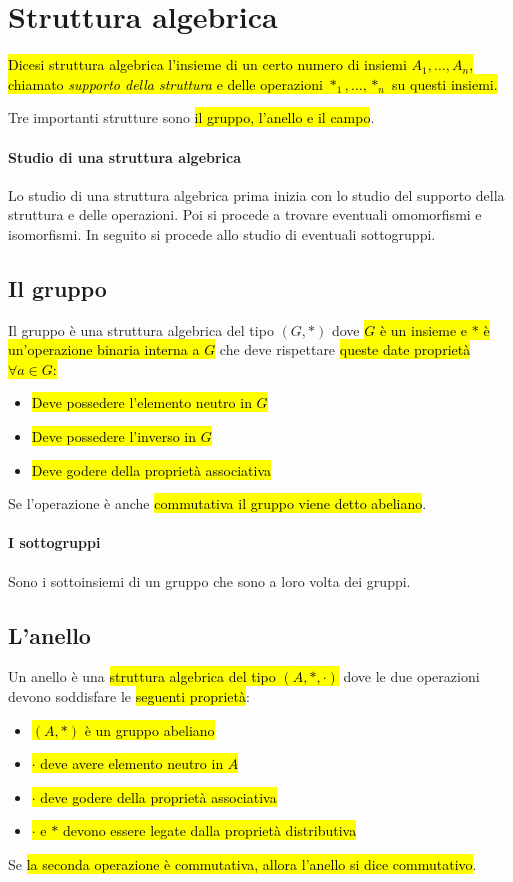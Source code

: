 \section{Struttura algebrica}
\hl{Dicesi struttura algebrica l'insieme di un certo numero di insiemi
$A_1, \ldots, A_n$, chiamato \textit{supporto della struttura} e delle
operazioni $\ast_1, \ldots, \ast_n$ su questi insiemi.}

Tre importanti strutture sono \hl{il gruppo, l'anello e il campo}.

\paragraph{Studio di una struttura algebrica} Lo studio di una struttura algebrica
prima inizia con lo studio del supporto della struttura e delle operazioni.
Poi si procede a trovare eventuali omomorfismi e isomorfismi. In seguito si
procede allo studio di eventuali sottogruppi.

\subsection{Il gruppo}
Il gruppo è una struttura algebrica del tipo $(G, \ast)$ dove \hl{$G$ è un insieme
e $\ast$ è un'operazione binaria interna a $G$} che deve rispettare \hl{queste
date proprietà $\forall a \in G$:}
\begin{itemize}
    \item \hl{Deve possedere l'elemento neutro in $G$}
    \item \hl{Deve possedere l'inverso in $G$}
    \item \hl{Deve godere della proprietà associativa}
\end{itemize}
Se l'operazione è anche \hl{commutativa il gruppo viene detto abeliano}.

\paragraph{I sottogruppi} Sono i sottoinsiemi di un gruppo che sono a loro volta
dei gruppi.

\subsection{L'anello}
Un anello è una \hl{struttura algebrica del tipo $(A, \ast, \cdot)$} dove le due
operazioni devono soddisfare le \hl{seguenti proprietà}:
\begin{itemize}
    \item \hl{$(A, \ast)$ è un gruppo abeliano}
    \item \hl{$\cdot$ deve avere elemento neutro in $A$}
    \item \hl{$\cdot$ deve godere della proprietà associativa}
    \item \hl{$\cdot$ e $\ast$ devono essere legate dalla proprietà distributiva}
\end{itemize}
Se \hl{la seconda operazione è commutativa, allora l'anello si dice commutativo}.

